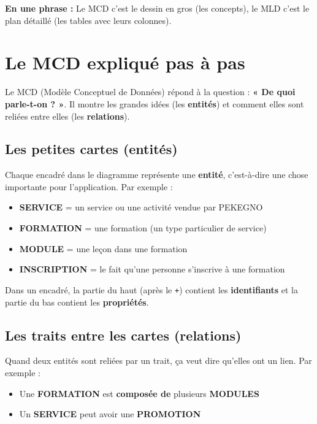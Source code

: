 \documentclass[12pt,a4paper]{article}
\begin{document}
\bigskip

\begin{resume}
    \textbf{En une phrase :} Le MCD c'est le dessin en gros (les concepts), le MLD c'est le plan détaillé (les tables avec leurs colonnes).
\end{resume}


\section{Le MCD expliqué pas à pas}

Le MCD (Modèle Conceptuel de Données) répond à la question : \textbf{« De quoi parle-t-on ? »}. Il montre les grandes idées (les \textbf{entités}) et comment elles sont reliées entre elles (les \textbf{relations}).

\subsection{Les petites cartes (entités)}

Chaque encadré dans le diagramme représente une \textbf{entité}, c'est-à-dire une chose importante pour l'application. Par exemple :
\begin{itemize}
    \item \textbf{SERVICE} = un service ou une activité vendue par PEKEGNO
    \item \textbf{FORMATION} = une formation (un type particulier de service)
    \item \textbf{MODULE} = une leçon dans une formation
    \item \textbf{INSCRIPTION} = le fait qu'une personne s'inscrive à une formation
\end{itemize}

Dans un encadré, la partie du haut (après le \texttt{+}) contient les \textbf{identifiants} et la partie du bas contient les \textbf{propriétés}.

\subsection{Les traits entre les cartes (relations)}

Quand deux entités sont reliées par un trait, ça veut dire qu'elles ont un lien. Par exemple :
\begin{itemize}
    \item Une \textbf{FORMATION} est \textbf{composée de} plusieurs \textbf{MODULES}
    \item Un \textbf{SERVICE} peut avoir une \textbf{PROMOTION}
\end{itemize}
\end{document}
